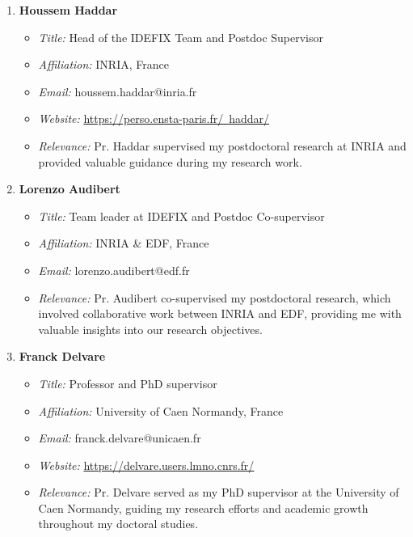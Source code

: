 \documentclass[10pt]{article} %
\begin{document}
\begin{enumerate}
	\item \textbf{Houssem Haddar}
	
	\begin{itemize}
		\item \textit{Title:} Head of the IDEFIX Team and Postdoc Supervisor
		\item \textit{Affiliation:} INRIA, France
		\item \textit{Email:} houssem.haddar@inria.fr
		\item \textit{Website:}  \href{	https://perso.ensta-paris.fr/~haddar/}{	https://perso.ensta-paris.fr/~haddar/}
		\item \textit{Relevance:} Pr. Haddar supervised my postdoctoral research at INRIA and provided valuable guidance during my research work.
	\end{itemize}
	
	\item \textbf{Lorenzo Audibert}
	
	\begin{itemize}
		\item \textit{Title:} Team leader at IDEFIX  and Postdoc Co-supervisor
		\item \textit{Affiliation:} INRIA \& EDF, France
		\item \textit{Email:} lorenzo.audibert@edf.fr
		\item \textit{Relevance:} Pr. Audibert co-supervised my postdoctoral research, which involved collaborative work between INRIA and EDF, providing me with valuable insights into our research objectives.
	\end{itemize}
	
	\item \textbf{Franck Delvare}
	
	\begin{itemize}
		\item \textit{Title:} Professor and PhD supervisor
		\item \textit{Affiliation:} University of Caen Normandy, France
		\item \textit{Email:} franck.delvare@unicaen.fr
	\item \textit{Website:} \href{https://delvare.users.lmno.cnrs.fr/}{https://delvare.users.lmno.cnrs.fr/}
		\item \textit{Relevance:} Pr. Delvare served as my PhD supervisor at the University of Caen Normandy, guiding my research efforts and academic growth throughout my doctoral studies.
	\end{itemize}




\end{enumerate}
\end{document}
